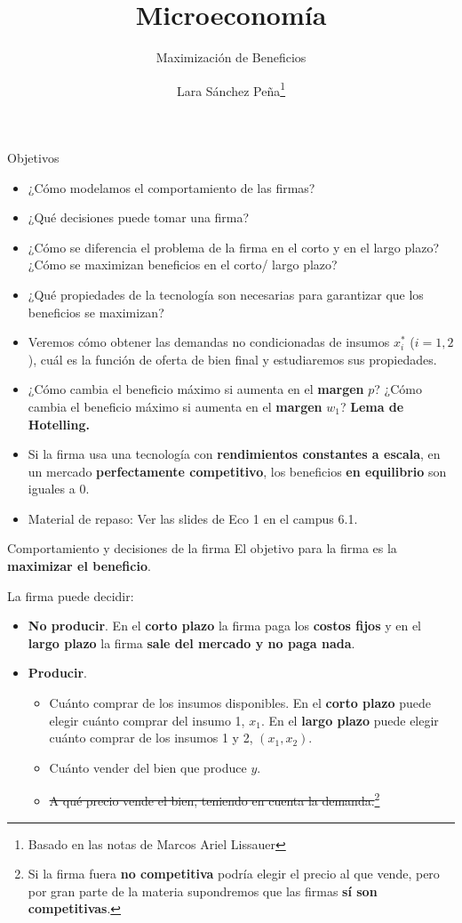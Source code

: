 \documentclass{beamer}
\title{Microeconom\'ia}
\subtitle{Maximizaci\'on de Beneficios \\ \mydate}
\author[Maximización de beneficios]{Lara Sánchez Peña\footnote{Basado en las notas de Marcos Ariel Lissauer}}
\institute[]{UTDT}
\date[UTDT 2023]{}
\theoremstyle{definition}
\begin{document}
\begin{frame}
  \titlepage
\end{frame}

\begin{frame}{Objetivos}

\begin{itemize}
    \item ¿Cómo modelamos el comportamiento de las firmas?
    \item ¿Qué decisiones puede tomar una firma?
    \item ¿Cómo se diferencia el problema de la firma en el corto y en el largo plazo? ¿Cómo se maximizan beneficios en el corto/ largo plazo?
      \item ¿Qué propiedades de la tecnología son necesarias para garantizar que los beneficios se maximizan?
      \item Veremos cómo obtener las demandas no condicionadas de insumos $x_i^*$ ($i=1,2$), cuál es la función de oferta de bien final y estudiaremos sus propiedades.
      \item ¿Cómo cambia el beneficio máximo si aumenta en el \textbf{margen} $p$? ¿Cómo cambia el beneficio máximo si aumenta en el \textbf{margen} $w_1$? \textbf{Lema de Hotelling.}
    \item Si la firma usa una tecnología con \textbf{rendimientos constantes a escala}, en un mercado \textbf{perfectamente competitivo}, los beneficios \textbf{en equilibrio} son iguales a 0.
    \item Material de repaso: Ver las slides de Eco 1 en el campus 6.1.
\end{itemize}
\end{frame}

\begin{frame}{Comportamiento y decisiones de la firma}
    El objetivo para la firma es la \textbf{maximizar el beneficio}.

    La firma puede decidir:
    \begin{itemize}
        \item \textbf{No producir}. En el \textbf{corto plazo} la firma paga los \textbf{costos fijos} y en el \textbf{largo plazo} la firma \textbf{sale del mercado y no paga nada}.
        \item \textbf{Producir}.
        \begin{itemize}
            \item Cuánto comprar de los insumos disponibles. En el \textbf{corto plazo} puede elegir cuánto comprar del insumo 1, $x_1$. En el \textbf{largo plazo} puede elegir cuánto comprar de los insumos 1 y 2, $(x_1,x_2)$.
            \item Cuánto vender del bien que produce $y$.
            \item \sout{A qué precio vende el bien, teniendo en cuenta la demanda.}\footnote{Si la firma fuera \textbf{no competitiva} podría elegir el precio al que vende, pero por gran parte de la materia supondremos que las firmas \textbf{sí son competitivas}.} 
        \end{itemize}
    \end{itemize}
\end{frame}
\end{document}

